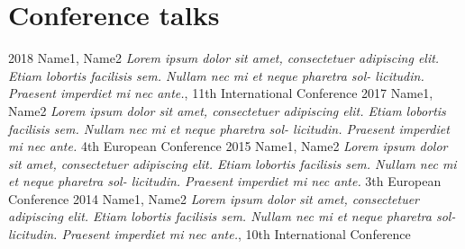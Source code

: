 \documentclass[%
  11pt,
  a4paper]{smooth-banner-cv}
\begin{document}
\newpage

\begin{sidebar}

  \vspace{1.15cm}

  

  

  
  
  {\begin{center}  \end{center}}
      
\end{sidebar}

\section{Conference talks}

\begin{simplelist}
   \simplelistitem
       {2018}
       {Name1, Name2 \newline
         \emph{Lorem ipsum dolor sit amet, consectetuer adipiscing elit. Etiam
          lobortis facilisis sem. Nullam nec mi et neque pharetra sol-
          licitudin. Praesent imperdiet mi nec ante.}, \newline 11th International Conference}
    \simplelistitem
        {2017}
        {Name1, Name2 \newline\emph{Lorem ipsum dolor sit amet, consectetuer adipiscing elit. Etiam
          lobortis facilisis sem. Nullam nec mi et neque pharetra sol-
          licitudin. Praesent imperdiet mi nec ante.} \newline 4th European Conference}
    \simplelistitem
        {2015}
        {Name1, Name2 \newline\emph{Lorem ipsum dolor sit amet, consectetuer adipiscing elit. Etiam
          lobortis facilisis sem. Nullam nec mi et neque pharetra sol-
          licitudin. Praesent imperdiet mi nec ante.} \newline 3th European Conference}
    \simplelistitem
        {2014}
        {Name1, Name2 \newline
          \emph{Lorem ipsum dolor sit amet, consectetuer adipiscing elit. Etiam
          lobortis facilisis sem. Nullam nec mi et neque pharetra sol-
          licitudin. Praesent imperdiet mi nec ante.}, \newline 10th International Conference}
\end{simplelist}
\end{document}
